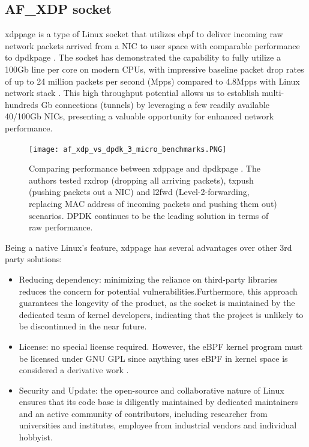 
\subsection{AF\_XDP socket}
\ac{xdppage} is a type of Linux socket that utilizes \ac{ebpf} to deliver incoming raw network packets arrived from a \ac{NIC} to user space with comparable performance to \ac{dpdkpage} \cite{karlsson_path_to_dpdk_speednodate}. 
The socket has demonstrated the capability to fully utilize a 100Gb line per core on modern CPUs, with impressive baseline packet drop rates of up to 24 million packets per second (Mpps) compared to 4.8Mpps with Linux network stack \cite{hoiland_jorgensen_express_2018} \cite{intel_dpdk_perf}.
This high throughput potential allows us to establish multi-hundreds Gb connections (tunnels) by leveraging a few readily available 40/100Gb NICs, presenting a valuable opportunity for enhanced network performance.

\begin{figure}[H]
	\centering
	\texttt{[image: af\_xdp\_vs\_dpdk\_3\_micro\_benchmarks.PNG]}
	\caption{Comparing performance between \ac{xdppage} and \ac{dpdkpage} \cite{karlsson_path_to_dpdk_speednodate}. The authors tested  rxdrop (dropping all arriving packets), txpush (pushing packets out a NIC) and l2fwd (Level-2-forwarding, replacing MAC address of incoming packets and pushing them out) scenarios. DPDK continues to be the leading solution in terms of raw performance.}\label{fig:sota:af_xdp_vs_dpdk_3_micro_benchmarks}
\end{figure}

Being a native Linux's feature, \ac{xdppage} has several advantages over other 3rd party solutions:
\begin{itemize}
	\item Reducing dependency: minimizing the reliance on third-party libraries reduces the concern for potential vulnerabilities.Furthermore, this approach guarantees the longevity of the product, as the socket is maintained by the dedicated team of kernel developers, indicating that the project is unlikely to be discontinued in the near future. 
	\item License: no special license required. However, the eBPF kernel program must be licensed under GNU \ac{GPL} since anything uses eBPF in kernel space is considered a derivative work \cite{gpl_email_discussion} \cite{linux_license_rule} \cite{lwn_clarify_bpf_license}.
	\item Security and Update: the open-source and collaborative nature of Linux ensures that its code base is diligently maintained by dedicated maintainers and an active community of contributors, including researcher from universities and institutes, employee from industrial vendors and individual hobbyist.
\end{itemize}

